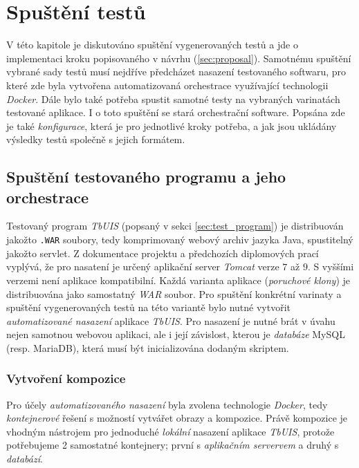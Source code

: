 \documentclass[czech, ma, kiv, he, iso690alph, pdf, viewonly]{fasthesis}
\begin{document}
\chapter{Spuštění testů}
 
    V této kapitole je diskutováno spuštění vygenerovaných testů a jde o implementaci kroku popisovaného v návrhu (\ref{sec:proposal}). Samotnému spuštění vybrané sady testů musí nejdříve předcházet nasazení testovaného softwaru, pro které zde byla vytvořena automatizovaná orchestrace využívající technologii \textit{Docker}. Dále bylo také potřeba spustit samotné testy na vybraných varinatách testované aplikace. I o toto spuštění se stará orchestrační software. Popsána zde je také \emph{konfigurace}, která je pro jednotlivé kroky potřeba, a jak jsou ukládány výsledky testů společně s jejich formátem.

    \section{Spuštění testovaného programu a jeho orchestrace}

    Testovaný program \textit{TbUIS} (popsaný v sekci \ref{sec:test_program}) je distribuován jakožto \verb|.WAR| soubory, tedy komprimovaný webový archiv jazyka Java, spustitelný jakožto \gls{servlet}. Z dokumentace projektu a předchozích diplomových prací vyplývá, že pro nasatení je určený aplikační server \textit{Tomcat} verze \(7\) až \(9\). S vyššími verzemi není aplikace kompatibilní. Každá varianta aplikace (\textit{poruchové klony}) je distribuována jako samostatný \textit{WAR} soubor. Pro spuštění konkrétní varinaty a spuštění vygenerovaných testů na této variantě bylo nutné vytvořit \textit{automatizované nasazení} aplikace \textit{TbUIS}. Pro nasazení je nutné brát v úvahu nejen samotnou webovou aplikaci, ale i její závislost, kterou je \textit{databáze} MySQL (resp. MariaDB), která musí být inicializována dodaným skriptem.

    \subsection{Vytvoření kompozice} \label{sec:composition}
    Pro účely \textit{automatizovaného nasazení} byla zvolena technologie \textit{Docker}, tedy \textit{kontejnerové} řešení s možností vytvářet obrazy a kompozice. Právě kompozice je vhodným nástrojem pro jednoduché \textit{lokální} nasazení aplikace \textit{TbUIS}, protože potřebujeme 2 samostatné kontejnery; první s \textit{aplikačním servervem} a druhý s \textit{databází}.
\end{document}

